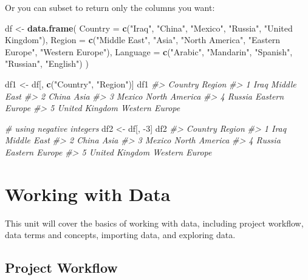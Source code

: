 \documentclass[]{book}
\newenvironment{Shaded}{\begin{snugshade}}{\end{snugshade}}
\newcommand{\CommentTok}[1]{\textcolor[rgb]{0.56,0.35,0.01}{\textit{#1}}}
\newcommand{\DataTypeTok}[1]{\textcolor[rgb]{0.13,0.29,0.53}{#1}}
\newcommand{\DecValTok}[1]{\textcolor[rgb]{0.00,0.00,0.81}{#1}}
\newcommand{\KeywordTok}[1]{\textcolor[rgb]{0.13,0.29,0.53}{\textbf{#1}}}
\newcommand{\NormalTok}[1]{#1}
\newcommand{\StringTok}[1]{\textcolor[rgb]{0.31,0.60,0.02}{#1}}
\begin{document}
Or you can subset to return only the columns you want:

\begin{Shaded}
\begin{Highlighting}[]
\NormalTok{df <-}\StringTok{ }\KeywordTok{data.frame}\NormalTok{(}
  \DataTypeTok{Country =} \KeywordTok{c}\NormalTok{(}\StringTok{"Iraq"}\NormalTok{, }\StringTok{"China"}\NormalTok{, }\StringTok{"Mexico"}\NormalTok{, }\StringTok{"Russia"}\NormalTok{, }\StringTok{"United Kingdom"}\NormalTok{),}
  \DataTypeTok{Region =} \KeywordTok{c}\NormalTok{(}\StringTok{"Middle East"}\NormalTok{, }\StringTok{"Asia"}\NormalTok{, }\StringTok{"North America"}\NormalTok{, }\StringTok{"Eastern Europe"}\NormalTok{, }\StringTok{"Western Europe"}\NormalTok{),}
  \DataTypeTok{Language =} \KeywordTok{c}\NormalTok{(}\StringTok{"Arabic"}\NormalTok{, }\StringTok{"Mandarin"}\NormalTok{, }\StringTok{"Spanish"}\NormalTok{, }\StringTok{"Russian"}\NormalTok{, }\StringTok{"English"}\NormalTok{)}
\NormalTok{)}

\NormalTok{df1 <-}\StringTok{ }\NormalTok{df[, }\KeywordTok{c}\NormalTok{(}\StringTok{"Country"}\NormalTok{, }\StringTok{"Region"}\NormalTok{)]}
\NormalTok{df1}
\CommentTok{#>          Country         Region}
\CommentTok{#> 1           Iraq    Middle East}
\CommentTok{#> 2          China           Asia}
\CommentTok{#> 3         Mexico  North America}
\CommentTok{#> 4         Russia Eastern Europe}
\CommentTok{#> 5 United Kingdom Western Europe}

\CommentTok{# using negative integers}
\NormalTok{df2 <-}\StringTok{ }\NormalTok{df[, }\DecValTok{-3}\NormalTok{]}
\NormalTok{df2}
\CommentTok{#>          Country         Region}
\CommentTok{#> 1           Iraq    Middle East}
\CommentTok{#> 2          China           Asia}
\CommentTok{#> 3         Mexico  North America}
\CommentTok{#> 4         Russia Eastern Europe}
\CommentTok{#> 5 United Kingdom Western Europe}
\end{Highlighting}
\end{Shaded}

\hypertarget{working-with-data}{%
\chapter{Working with Data}\label{working-with-data}}

This unit will cover the basics of working with data, including project workflow, data terms and concepts, importing data, and exploring data.

\hypertarget{project-workflow}{%
\section{Project Workflow}\label{project-workflow}}
\end{document}
